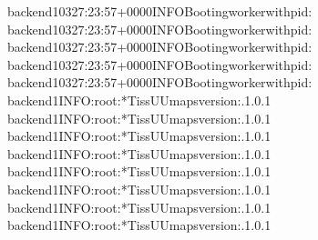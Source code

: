 \documentclass[letterpaper,10pt,english,openany,oneside]{sphinxmanual}
\begin{document}
\begin{enumerate}
\begin{sphinxVerbatim}[commandchars=\\\{\}]
backend\PYGZus{}1\PYG{o}{[}\PYGZhy{}03\PYGZhy{}27:23:57+0000\PYG{o}{]}\PYG{o}{[}\PYG{o}{]}\PYG{o}{[}INFO\PYG{o}{]}Bootingworkerwithpid:
backend\PYGZus{}1\PYG{o}{[}\PYGZhy{}03\PYGZhy{}27:23:57+0000\PYG{o}{]}\PYG{o}{[}\PYG{o}{]}\PYG{o}{[}INFO\PYG{o}{]}Bootingworkerwithpid:
backend\PYGZus{}1\PYG{o}{[}\PYGZhy{}03\PYGZhy{}27:23:57+0000\PYG{o}{]}\PYG{o}{[}\PYG{o}{]}\PYG{o}{[}INFO\PYG{o}{]}Bootingworkerwithpid:
backend\PYGZus{}1\PYG{o}{[}\PYGZhy{}03\PYGZhy{}27:23:57+0000\PYG{o}{]}\PYG{o}{[}\PYG{o}{]}\PYG{o}{[}INFO\PYG{o}{]}Bootingworkerwithpid:
backend\PYGZus{}1\PYG{o}{[}\PYGZhy{}03\PYGZhy{}27:23:57+0000\PYG{o}{]}\PYG{o}{[}\PYG{o}{]}\PYG{o}{[}INFO\PYG{o}{]}Bootingworkerwithpid:
backend\PYGZus{}1INFO:root:*TissUUmapsversion:.1.0.1
backend\PYGZus{}1INFO:root:*TissUUmapsversion:.1.0.1
backend\PYGZus{}1INFO:root:*TissUUmapsversion:.1.0.1
backend\PYGZus{}1INFO:root:*TissUUmapsversion:.1.0.1
backend\PYGZus{}1INFO:root:*TissUUmapsversion:.1.0.1
backend\PYGZus{}1INFO:root:*TissUUmapsversion:.1.0.1
backend\PYGZus{}1INFO:root:*TissUUmapsversion:.1.0.1
backend\PYGZus{}1INFO:root:*TissUUmapsversion:.1.0.1
\end{sphinxVerbatim}


\end{enumerate}
\end{document}
